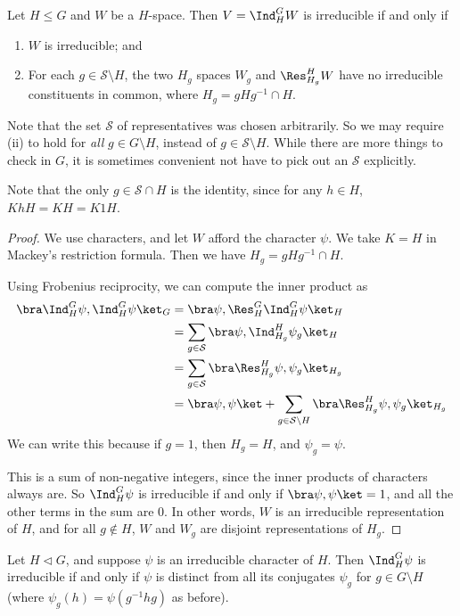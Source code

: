 \documentclass[a4paper]{article}
\begin{document}
\begin{cor}
  Let $H \leq G$ and $W$ be a $H$-space. Then $V = \Ind_H^G W$ is irreducible if and only if
  \begin{enumerate}
    \item $W$ is irreducible; and
    \item For each $g \in \mathcal{S} \setminus H$, the two $H_g$ spaces $W_g$ and $\Res_{H_g}^H W$ have no irreducible constituents in common, where $H_g = gHg^{-1}\cap H$.
  \end{enumerate}
\end{cor}
Note that the set $\mathcal{S}$ of representatives was chosen arbitrarily. So we may require (ii) to hold for \emph{all} $g \in G \setminus H$, instead of $g \in \mathcal{S} \setminus H$. While there are more things to check in $G$, it is sometimes convenient not have to pick out an $\mathcal{S}$ explicitly.

Note that the only $g \in \mathcal{S} \cap H$ is the identity, since for any $h \in H$, $KhH = KH = K1H$.

\begin{proof}
  We use characters, and let $W$ afford the character $\psi$. We take $K = H$ in Mackey's restriction formula. Then we have $H_g = gHg^{-1} \cap H$.

  Using Frobenius reciprocity, we can compute the inner product as
  \begin{align*}
    \bra \Ind_H^G \psi, \Ind_H^G \psi\ket_G &= \bra \psi, \Res_H^G \Ind_H^G \psi\ket_H\\
    &= \sum_{g \in \mathcal{S}} \bra \psi, \Ind_{H_g}^H \psi_g\ket_H\\
    &= \sum_{g \in \mathcal{S}} \bra \Res_{H_g}^H \psi , \psi_g\ket_{H_g}\\
    &= \bra\psi, \psi\ket + \sum_{g \in \mathcal{S} \setminus H} \bra \Res_{H_g}^H \psi, \psi_g \ket_{H_g}
  \end{align*}
  We can write this because if $g = 1$, then $H_g = H$, and $\psi_g = \psi$.

  This is a sum of non-negative integers, since the inner products of characters always are. So $\Ind_H^G \psi$ is irreducible if and only if $\bra \psi, \psi\ket = 1$, and all the other terms in the sum are $0$. In other words, $W$ is an irreducible representation of $H$, and for all $g \not \in H$, $W$ and $W_g$ are disjoint representations of $H_g$.
\end{proof}

\begin{cor}
  Let $H \lhd G$, and suppose $\psi$ is an irreducible character of $H$. Then $\Ind_H^G \psi$ is irreducible if and only if $\psi$ is distinct from all its conjugates $\psi_g$ for $g \in G \setminus H$ (where $\psi_g(h) = \psi(g^{-1}hg)$ as before).
\end{cor}
\end{document}
